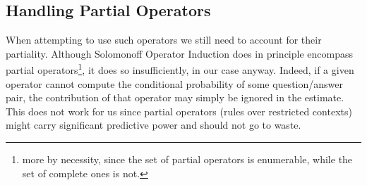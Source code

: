 \documentclass[runningheads]{llncs}
\begin{document}
\subsection{Handling Partial Operators}
\label{ha-pa-op}
When attempting to use such operators we still need to account for
their partiality. Although Solomonoff Operator Induction does in
principle encompass partial operators\footnote{more by necessity,
  since the set of partial operators is enumerable, while the set of
  complete ones is not.}, it does so insufficiently, in our case
anyway. Indeed, if a given operator cannot compute the conditional
probability of some question/answer pair, the contribution of that
operator may simply be ignored in the estimate. This does not work for
us since partial operators (rules over restricted contexts) might
carry significant predictive power and should not go to waste.
\end{document}
